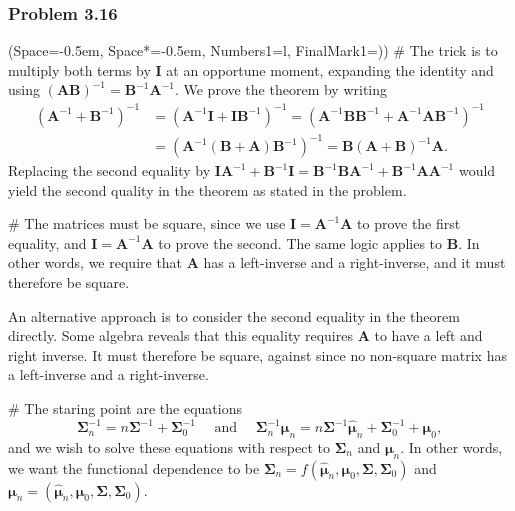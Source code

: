 \documentclass[12pt, a4paper]{article}
\newcommand{\listSpace}{-0.5em}%
\newcommand{\vect}[1]{\bm{#1}}
\begin{document}
\subsubsection*{Problem 3.16}
\begin{easylist}[enumerate]
	\ListProperties(Space=\listSpace, Space*=\listSpace, Numbers1=l, FinalMark1={)})
	# The trick is to multiply both terms by $\vect{I}$ at an opportune moment, expanding the identity and using $\left(\vect{A} \vect{B}\right)^{-1} = \vect{B}^{-1} \vect{A}^{-1}$. 
	We prove the theorem by writing
	\begin{align*}
	\left( \vect{A}^{-1} + \vect{B}^{-1}\right)^{-1} &=
		\left( \vect{A}^{-1} \vect{I} + \vect{I}\vect{B}^{-1}\right)^{-1} =
		\left( \vect{A}^{-1} \vect{B} \vect{B}^{-1} + \vect{A}^{-1} \vect{A}\vect{B}^{-1}\right)^{-1} \\
		&=  \left( \vect{A}^{-1} \left( \vect{B} + \vect{A} \right) \vect{B}^{-1} \right)^{-1} = 
		 \vect{B}\left( \vect{A} + \vect{B} \right)^{-1} \vect{A}.
	\end{align*}
	Replacing the second equality by $\vect{I} \vect{A}^{-1}  + \vect{B}^{-1} \vect{I} = \vect{B}^{-1} \vect{B}  \vect{A}^{-1} + \vect{B}^{-1} \vect{A} \vect{A}^{-1}$ would yield the second quality in the theorem as stated in the problem.
	
	# The matrices must be square, since we use $\vect{I} = \vect{A}^{-1} \vect{A}$ to prove the first equality, and $\vect{I} = \vect{A}^{-1} \vect{A}$ to prove the second. The same logic applies to $\vect{B}$.
	In other words, we require that $\vect{A}$ has a left-inverse and a right-inverse, and it must therefore be square.
	
	An alternative approach is to consider the second equality in the theorem directly.
	Some algebra reveals that this equality requires $\vect{A}$ to have a left and right inverse.
	It must therefore be square, against since no non-square matrix has a left-inverse and a right-inverse.
	
	# The staring point are the equations
	\begin{equation*}
		\vect{\Sigma}_n^{-1} = n \vect{\Sigma}^{-1} + \vect{\Sigma}_0^{-1}
		\quad \text{ and } \quad
		\vect{\Sigma}_n^{-1} \vect{\mu}_n 
		=n \vect{\Sigma}^{-1} \hat{\vect{\mu}}_n 
		+
		\vect{\Sigma}^{-1}_0 + \vect{\mu}_0,
	\end{equation*}
	and we wish to solve these equations with respect to $\vect{\Sigma}_n$ and $\vect{\mu}_n$. 
	In other words, we want the functional dependence to be 
	$\vect{\Sigma}_n = f \left( \hat{\vect{\mu}}_n, \vect{\mu}_0, \vect{\Sigma}, \vect{\Sigma}_0 \right)$
	and $\vect{\mu}_n = \left( \hat{\vect{\mu}}_n, \vect{\mu}_0, \vect{\Sigma}, \vect{\Sigma}_0 \right)$.
	

\end{easylist}
\end{document}
